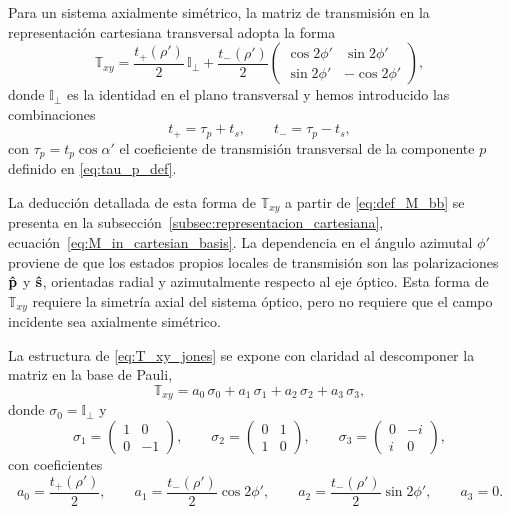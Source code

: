Para un sistema axialmente simétrico, la matriz de transmisión en la
representación cartesiana transversal adopta la forma
\begin{equation}
\mathbb{T}_{xy}
=
\frac{t_+(\rho')}{2}\,\mathbb{I}_{\perp}
+
\frac{t_-(\rho')}{2}
\begin{pmatrix}
\cos 2\phi' & \sin 2\phi' \\
\sin 2\phi' & -\cos 2\phi'
\end{pmatrix},
\label{eq:T_xy_jones}
\end{equation}
donde $\mathbb{I}_{\perp}$ es la identidad en el plano transversal y hemos
introducido las combinaciones
\begin{equation}
t_+
=
\tau_p+t_s,
\qquad
t_-
=
\tau_p-t_s,
\label{eq:t_plus_t_minus_def}
\end{equation}
con $\tau_p=t_p\cos\alpha'$ el coeficiente de transmisión transversal de la componente $p$ definido en \eqref{eq:tau_p_def}.

La deducción detallada de esta forma de $\mathbb{T}_{xy}$ a partir de
\eqref{eq:def_M_bb} se presenta en la
subsección~\ref{subsec:representacion_cartesiana},
ecuación~\eqref{eq:M_in_cartesian_basis}. La dependencia en el ángulo azimutal
$\phi'$ proviene de que los estados propios locales de transmisión son las
polarizaciones $\bm{\hat{\mathbf{p}}}$ y $\bm{\hat{\mathbf{s}}}$, orientadas radial y
azimutalmente respecto al eje óptico. Esta forma de $\mathbb{T}_{xy}$ requiere
la simetría axial del sistema óptico, pero no requiere que el campo incidente
sea axialmente simétrico.

La estructura de \eqref{eq:T_xy_jones} se expone con claridad al descomponer
la matriz en la base de Pauli,
\begin{equation}
\mathbb{T}_{xy}
=
a_0\,\sigma_0 + a_1\,\sigma_1 + a_2\,\sigma_2 + a_3\,\sigma_3,
\label{eq:T_xy_pauli}
\end{equation}
donde $\sigma_0=\mathbb{I}_{\perp}$ y
\begin{equation*}
\sigma_1
=
\begin{pmatrix}
1 & 0 \\ 0 & -1
\end{pmatrix},
\qquad
\sigma_2
=
\begin{pmatrix}
0 & 1 \\ 1 & 0
\end{pmatrix},
\qquad
\sigma_3
=
\begin{pmatrix}
0 & -i \\ i & 0
\end{pmatrix},
\end{equation*}
con coeficientes
\begin{equation}
a_0=\frac{t_+(\rho')}{2},
\qquad
a_1=\frac{t_-(\rho')}{2}\cos 2\phi',
\qquad
a_2=\frac{t_-(\rho')}{2}\sin 2\phi',
\qquad
a_3=0.
\label{eq:T_xy_pauli_coeffs}
\end{equation}

